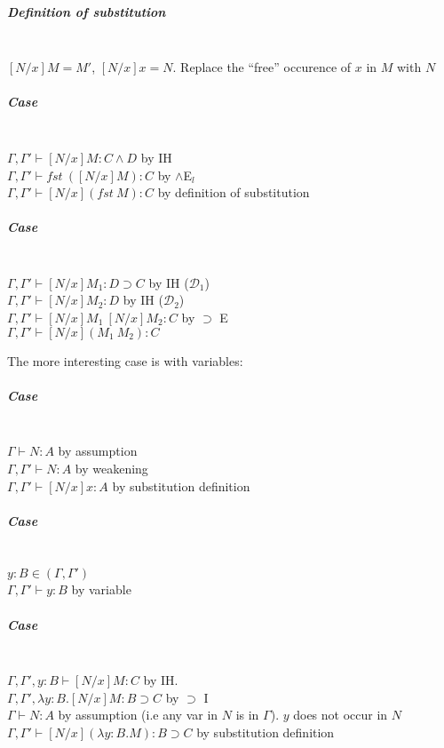 \documentclass[12 pt]{article}
\begin{document}
    \subparagraph{Definition of substitution}
    ~\\$[N/x]M = M'$, $[N/x] x = N$. Replace the ``free'' occurence of
    $x$ in $M$ with $N$
    
    \subparagraph{Case}
    \noLine
    \DP
    \\ $\Gamma, \Gamma ' \vdash [N/x] M : C\land D$ by IH
    \\ $\Gamma, \Gamma ' \vdash fst\ ([N/x]M) : C$ by $\land$E$_l$
    \\$\Gamma, \Gamma' \vdash [N/x](fst \ M) : C$ by definition of substitution
    \subparagraph{Case}
    \noLine
    
    \noLine
    \DP
    \\ $\Gamma, \Gamma ' \vdash [N/x] M_1 : D \supset C$ by IH ($\mathcal{D}_1$)
    \\ $\Gamma, \Gamma ' \vdash [N/x] M_2 : D$ by IH ($\mathcal{D}_2$)
    \\$\Gamma, \Gamma' \vdash [N/x]M_1 \ [N/x]M_2 : C$ by $\supset$ E
    \\ $\Gamma, \Gamma' \vdash [N/x](M_1\ M_2) : C$

    The more interesting case is with variables:
    \subparagraph{Case}
    
    \DP
    \\ $\Gamma \vdash N:A$ by assumption
    \\ $\Gamma, \Gamma' \vdash N : A$ by weakening
    \\ $\Gamma, \Gamma' \vdash [N/x]x : A$ by substitution definition
    \subparagraph{Case}
    
    \DP
    \\ $y:B \in (\Gamma, \Gamma')$
    \\ $\Gamma, \Gamma' \vdash y : B$ by variable
    \subparagraph{Case}
    
    \DP
    \\ $\Gamma, \Gamma', y:B \vdash [N/x] M:C$ by IH.
    \\ $\Gamma, \Gamma', \lambda y : B . [N/x] M: B \supset C$ by $\supset$ I 
    \\ $\Gamma \vdash N : A$ by assumption (i.e any var in $N$ is in
    $\Gamma$). $y$ does not occur in $N$
    \\ $\Gamma, \Gamma ' \vdash [N/x] (\lambda y:B.M) : B \supset C$
    by substitution definition
\end{document}
